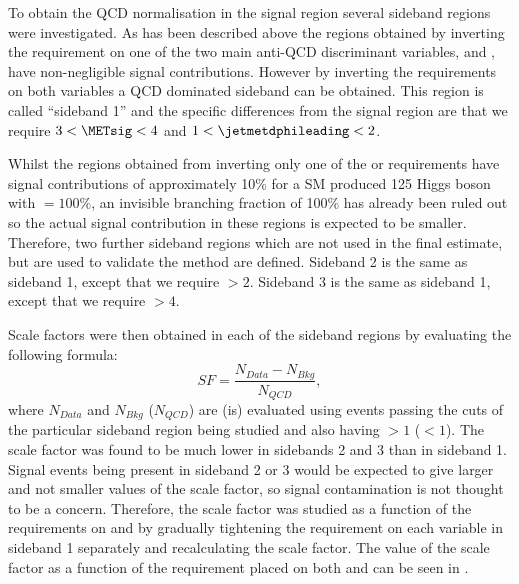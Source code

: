 To obtain the \ac{QCD} normalisation in the signal region several sideband regions were investigated. As has been described above the regions obtained by inverting the requirement on one of the two main anti-\ac{QCD} discriminant variables, \jetmetdphi and \METsig, have non-negligible signal contributions. However by inverting the requirements on both variables a \ac{QCD} dominated sideband can be obtained. This region is called ``sideband 1'' and the specific differences from the signal region are that we require $3<\METsig<4$ and $1<\jetmetdphileading<2$.  

Whilst the regions obtained from inverting only one of the \jetmetdphi or \METsig requirements have signal contributions of approximately 10\% for a \ac{SM} produced 125 \GeV Higgs boson with \BRinv$=100\%$, an invisible branching fraction of 100\% has already been ruled out so the actual signal contribution in these regions is expected to be smaller. Therefore, two further sideband regions which are not used in the final estimate, but are used to validate the method are defined. Sideband 2 is the same as sideband 1, except that we require \jetmetdphileading$>2$. Sideband 3 is the same as sideband 1, except that we require \METsig$>4$. 



Scale factors were then obtained in each of the sideband regions by evaluating the following formula:
\begin{equation}
  SF=\frac{N_{Data}-N_{Bkg}}{N_{QCD}},
  \label{eq:parkedqcdscalefactor}
\end{equation}
where $N_{Data}$ and $N_{Bkg}$ ($N_{QCD}$) are (is)  evaluated using events passing the cuts of the particular sideband region being studied and also having \jetmetdphi$>1$ (\jetmetdphi$<1$). The scale factor was found to be much lower in sidebands 2 and 3 than in sideband 1. Signal events being present in sideband 2 or 3 would be expected to give larger and not smaller values of the scale factor, so signal contamination is not thought to be a concern. Therefore, the scale factor was studied as a function of the requirements on \jetmetdphileading and \METsig by gradually tightening the requirement on each variable in sideband 1 separately and recalculating the scale factor. The value of the scale factor as a function of the requirement placed on both \jetmetdphileading and \METsig can be seen in .


